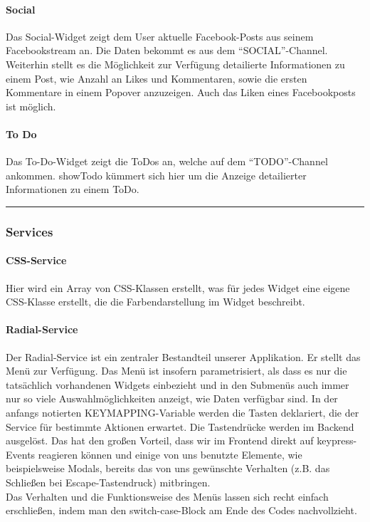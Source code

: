 \documentclass[10pt,a4paper]{report}
\newcommand{\code}[1]{{\fontfamily{cmvtt}\selectfont #1}}
\newcommand{\HRule}{\rule{\linewidth}{0.1pt}} %
\begin{document}
				\paragraph{Social}
					Das Social-Widget zeigt dem User aktuelle Facebook-Posts aus seinem Facebookstream an. Die Daten bekommt es aus dem "`SOCIAL"'-Channel. Weiterhin stellt es die Möglichkeit zur Verfügung detailierte Informationen zu einem Post, wie Anzahl an Likes und Kommentaren, sowie die ersten Kommentare in einem Popover anzuzeigen. Auch das Liken eines Facebookposts ist möglich.
				\paragraph{To Do}
					Das To-Do-Widget zeigt die ToDos an, welche auf dem "`TODO"'-Channel ankommen. \code{showTodo} kümmert sich hier um die Anzeige detailierter Informationen zu einem ToDo.\\
				\HRule
			\subsubsection{Services}
				\paragraph{CSS-Service}
					Hier wird ein Array von CSS-Klassen erstellt, was für jedes Widget eine eigene CSS-Klasse erstellt, die die Farbendarstellung im Widget beschreibt.
				\paragraph{Radial-Service}
					Der Radial-Service ist ein zentraler Bestandteil unserer Applikation. Er stellt das Menü zur Verfügung. Das Menü ist insofern parametrisiert, als dass es nur die tatsächlich vorhandenen Widgets einbezieht und in den Submenüs auch immer nur so viele Auswahlmöglichkeiten anzeigt, wie Daten verfügbar sind. In der anfangs notierten \code{KEYMAPPING}-Variable werden die Tasten deklariert, die der Service für bestimmte Aktionen erwartet. Die Tastendrücke werden im Backend ausgelöst. Das hat den großen Vorteil, dass wir im Frontend direkt auf keypress-Events reagieren können und einige von uns benutzte Elemente, wie beispielsweise Modals, bereits das von uns gewünschte Verhalten (z.B. das Schließen bei Escape-Tastendruck) mitbringen.\\
					Das Verhalten und die Funktionsweise des Menüs lassen sich recht einfach erschließen, indem man den switch-case-Block am Ende des Codes nachvollzieht.
\end{document}
